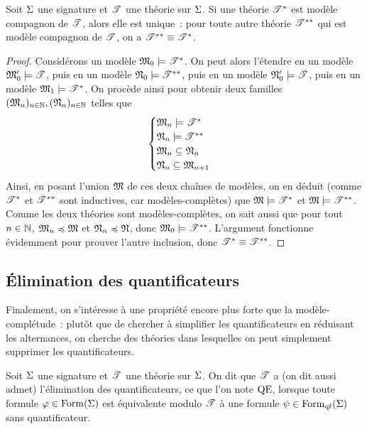 \begin{theorem}
  Soit $\Sigma$ une signature et $\mathscr T$ une théorie sur $\Sigma$. Si une théorie
  $\mathscr T^*$ est modèle compagnon de $\mathscr T$, alors elle est unique~: pour toute
  autre théorie $\mathscr T^{**}$ qui est modèle compagnon de $\mathscr T$, on a
  $\mathscr T^{**} \equiv \mathscr T^*$.
\end{theorem}

\begin{proof}
  Considérons un modèle $\mathfrak{M}_0\models\mathscr T^*$. On peut alors l'étendre
  en un modèle $\mathfrak{M}'_0\models\mathscr T$, puis en un modèle
  $\mathfrak{N}_0\models\mathscr T^{**}$, puis en un modèle $\mathfrak{N}'_0\models\mathscr T$, puis
  en un modèle $\mathfrak{M}_1\models\mathscr T^*$. On procède ainsi pour obtenir deux
  familles $(\mathfrak{M}_n)_{n\in\mathbb N},(\mathfrak{N}_n)_{n\in\mathbb N}$ telles que
  \[\begin{cases}
  \mathfrak{M}_n\models \mathscr T^*\\
  \mathfrak{N}_n\models \mathscr T^{**}\\
  \mathfrak{M}_n\subseteq\mathfrak{N}_n\\
  \mathfrak{N}_n\subseteq\mathfrak{M}_{n+1}
  \end{cases}\]
  Ainsi, en posant l'union $\mathfrak{M}$ de ces deux chaînes de modèles, on en
  déduit (comme $\mathscr T^*$ et $\mathscr T^{**}$ sont inductives, car
  modèles-complètes) que $\mathfrak{M}\models\mathscr T^*$ et $\mathfrak{M}\models\mathscr T^{**}$.
  Comme les deux théories sont modèles-complètes, on sait aussi que
  pour tout $n\in\mathbb N$, $\mathfrak{M}_n\preccurlyeq \mathfrak{M}$ et
  $\mathfrak{N}_n\preccurlyeq\mathfrak{N}$, donc $\mathfrak{M}_0\models\mathscr T^{**}$. L'argument
  fonctionne évidemment pour prouver l'autre inclusion, donc
  $\mathscr T^{*}\equiv\mathscr T^{**}$.
\end{proof}

\subsection{\'Elimination des quantificateurs}

Finalement, on s'intéresse à une propriété encore plus forte que la
modèle-complétude~: plutôt que de chercher à simplifier les quantificateurs en
réduisant les alternances, on cherche des théories dans lesquelles on peut
simplement supprimer les quantificateurs.

\begin{definition}
  Soit $\Sigma$ une signature et $\mathscr T$ une théorie sur $\Sigma$. On dit que
  $\mathscr T$ a (on dit aussi \og admet\fg) l'élimination des quantificateurs, ce
  que l'on note $\operatorname{QE}$, lorsque toute formule $\varphi\in\operatorname{Form}(\Sigma)$
  est équivalente modulo $\mathscr T$ à une formule $\psi\in\operatorname{Form}_{\mathrm{qf}}(\Sigma)$
  sans quantificateur.
\end{definition}

